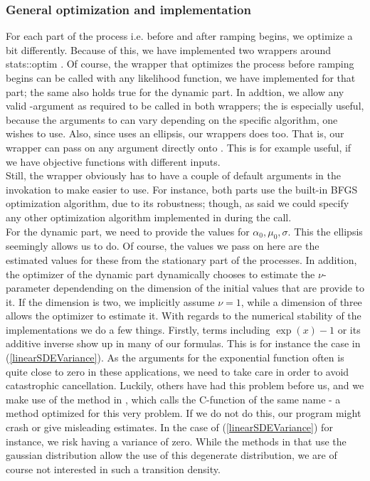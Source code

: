 \subsubsection{General optimization and implementation}
For each part of the process i.e. before and after ramping begins, we optimize a bit differently. Because of this, we have implemented two wrappers around {stats::optim} \cite{Rlang}. Of course, the wrapper that optimizes the process before ramping begins can be called with any likelihood function, we have implemented for that part; the same also holds true for the dynamic part. In addtion, we allow any valid -argument as required to be called in both wrappers; the is especially useful, because the arguments to  can vary depending on the specific algorithm, one wishes to use. Also, since  uses an ellipsis, our wrappers does too. That is, our wrapper can pass on any argument directly onto . This is for example useful, if we have objective functions with different inputs.\\
Still, the wrapper obviously has to have a couple of default arguments in the invokation to make easier to use. For instance, both parts use the built-in BFGS optimization algorithm, due to its robustness; though, as said we could specify any other optimization algorithm implemented in  during the call.\\ For the dynamic part, we need to provide the values for $\alpha_0, \mu_0, \sigma$. This the ellipsis seemingly allows us to do. Of course, the values we pass on here are the estimated values for these from the stationary part of the processes. In addition, the optimizer of the dynamic part dynamically chooses to estimate the $\nu$-parameter dependending on the dimension of the initial values that are provide to it. If the dimension is two, we implicitly assume $\nu = 1$, while a dimension of three allows the optimizer to estimate it. With regards to the numerical stability of the implementations we do a few things. Firstly, terms including $\exp\left(x\right) - 1$ or its additive inverse show up in many of our formulas. This is for instance the case in (\ref{linearSDEVariance}). As the arguments for the exponential function often is quite close to zero in these applications, we need to take care in order to avoid catastrophic cancellation. Luckily, others have had this problem before us, and we make use of the  method in , which calls the C-function of the same name \cite{cppreference_expm1} - a method optimized for this very problem. If we do not do this, our program might crash or give misleading estimates. In the case of (\ref{linearSDEVariance}) for instance, we risk having a variance of zero. While the methods in  that use the gaussian distribution allow the use of this degenerate distribution, we are of course not interested in such a transition density.
